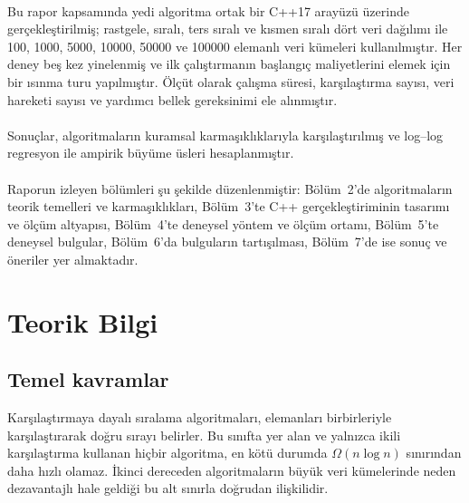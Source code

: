 \documentclass[12pt,a4paper]{article}
\begin{document}
\paragraph{}Bu rapor kapsamında yedi algoritma ortak bir C++17 arayüzü üzerinde gerçekleştirilmiş;
rastgele, sıralı, ters sıralı ve kısmen sıralı dört veri dağılımı ile 100,
1000, 5000, 10000, 50000 ve 100000 elemanlı veri kümeleri kullanılmıştır.
Her deney beş kez yinelenmiş ve ilk çalıştırmanın başlangıç maliyetlerini elemek
için bir ısınma turu yapılmıştır. Ölçüt olarak çalışma süresi, karşılaştırma
sayısı, veri hareketi sayısı ve yardımcı bellek gereksinimi ele alınmıştır.

\paragraph{}Sonuçlar, algoritmaların kuramsal karmaşıklıklarıyla karşılaştırılmış ve
log--log regresyon ile ampirik büyüme üsleri hesaplanmıştır.

\paragraph{}Raporun izleyen bölümleri şu şekilde düzenlenmiştir: Bölüm~2'de algoritmaların
teorik temelleri ve karmaşıklıkları, Bölüm~3'te C++ gerçekleştiriminin tasarımı
ve ölçüm altyapısı, Bölüm~4'te deneysel yöntem ve ölçüm ortamı, Bölüm~5'te
deneysel bulgular, Bölüm~6'da bulguların tartışılması, Bölüm~7'de ise sonuç ve
öneriler yer almaktadır.

\section{Teorik Bilgi}

\subsection{Temel kavramlar}

Karşılaştırmaya dayalı sıralama algoritmaları, elemanları birbirleriyle
karşılaştırarak doğru sırayı belirler. Bu sınıfta yer alan ve yalnızca ikili
karşılaştırma kullanan hiçbir algoritma, en kötü durumda $\Omega(n \log n)$
sınırından daha hızlı olamaz. İkinci dereceden algoritmaların büyük veri
kümelerinde neden dezavantajlı hale geldiği bu alt sınırla doğrudan ilişkilidir.
\end{document}
